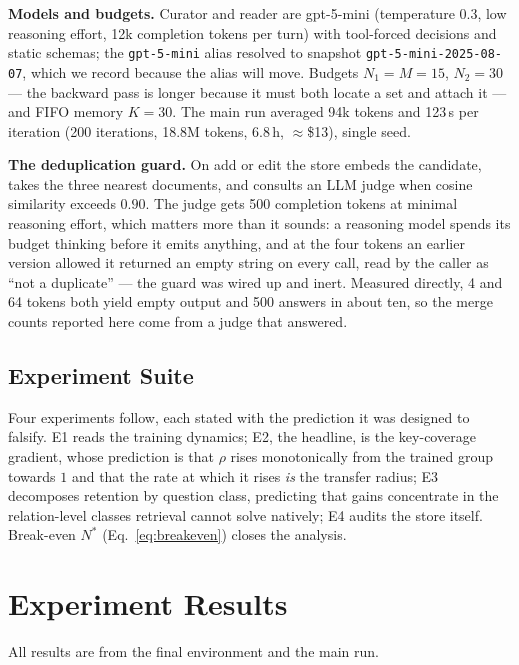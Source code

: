 \documentclass[conference]{IEEEtran}
\begin{document}
\textbf{Models and budgets.} Curator and reader are gpt-5-mini (temperature
0.3, low reasoning effort, 12k completion tokens per turn) with tool-forced
decisions and static schemas; the \texttt{gpt-5-mini} alias resolved to
snapshot \texttt{gpt-5-mini-2025-08-07}, which we record because the alias
will move. Budgets $N_1{=}M{=}15$, $N_2{=}30$ --- the backward pass is longer
because it must both locate a set and attach it --- and FIFO memory $K{=}30$.
The main run averaged 94k tokens and 123\,s per iteration (200 iterations,
18.8M tokens, 6.8\,h, $\approx$\$13), single seed.

\textbf{The deduplication guard.} On add or edit the store embeds the
candidate, takes the three nearest documents, and consults an LLM judge when
cosine similarity exceeds $0.90$. The judge gets 500 completion tokens at
minimal reasoning effort, which matters more than it sounds: a reasoning
model spends its budget thinking before it emits anything, and at the four
tokens an earlier version allowed it returned an empty string on every call,
read by the caller as ``not a duplicate'' --- the guard was wired up and
inert. Measured directly, 4 and 64 tokens both yield empty output and 500
answers in about ten, so the merge counts reported here come from a judge
that answered.

\subsection{Experiment Suite}\label{sec:suite}
Four experiments follow, each stated with the prediction it was designed to
falsify. E1 reads the training dynamics; E2, the headline, is the
key-coverage gradient, whose prediction is that $\rho$ rises monotonically
from the trained group towards $1$ and that the rate at which it rises
\emph{is} the transfer radius; E3 decomposes retention by question class,
predicting that gains concentrate in the relation-level classes retrieval
cannot solve natively; E4 audits the store itself. Break-even $N^{*}$
(Eq.~\ref{eq:breakeven}) closes the analysis.

\section{Experiment Results}\label{sec:prelim}
All results are from the final environment and the main run.
\end{document}
